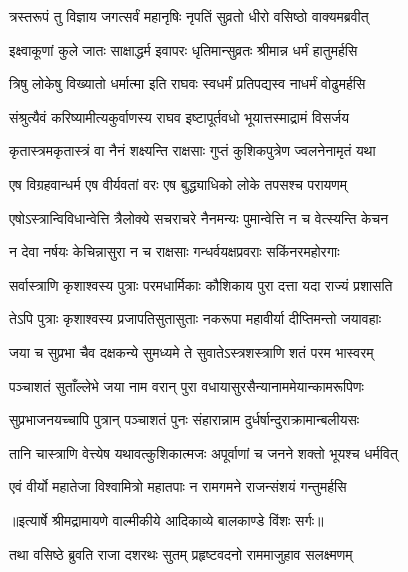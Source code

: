\twolineshloka
{त्रस्तरूपं तु विज्ञाय जगत्सर्वं महानृषिः}
{नृपतिं सुव्रतो धीरो वसिष्ठो वाक्यमब्रवीत्} %

\twolineshloka
{इक्ष्वाकूणां कुले जातः साक्षाद्धर्म इवापरः}
{धृतिमान्सुव्रतः श्रीमान्न धर्मं हातुमर्हसि} %

\twolineshloka
{त्रिषु लोकेषु विख्यातो धर्मात्मा इति राघवः}
{स्वधर्मं प्रतिपद्यस्व नाधर्मं वोढुमर्हसि} %

\twolineshloka
{संश्रुत्यैवं करिष्यामीत्यकुर्वाणस्य राघव}
{इष्टापूर्तवधो भूयात्तस्माद्रामं विसर्जय} %

\twolineshloka
{कृतास्त्रमकृतास्त्रं वा नैनं शक्ष्यन्ति राक्षसाः}
{गुप्तं कुशिकपुत्रेण ज्वलनेनामृतं यथा} %

\twolineshloka
{एष विग्रहवान्धर्म एष वीर्यवतां वरः}
{एष बुद्ध्याधिको लोके तपसश्च परायणम्} %

\twolineshloka
{एषोऽस्त्रान्विविधान्वेत्ति त्रैलोक्ये सचराचरे}
{नैनमन्यः पुमान्वेत्ति न च वेत्स्यन्ति केचन} %

\twolineshloka
{न देवा नर्षयः केचिन्नासुरा न च राक्षसाः}
{गन्धर्वयक्षप्रवराः सकिंनरमहोरगाः} %

\twolineshloka
{सर्वास्त्राणि कृशाश्वस्य पुत्राः परमधार्मिकाः}
{कौशिकाय पुरा दत्ता यदा राज्यं प्रशासति} %

\twolineshloka
{तेऽपि पुत्राः कृशाश्वस्य प्रजापतिसुतासुताः}
{नकरूपा महावीर्या दीप्तिमन्तो जयावहाः} %

\twolineshloka
{जया च सुप्रभा चैव दक्षकन्ये सुमध्यमे}
{ते सुवातेऽस्त्रशस्त्राणि शतं परम भास्वरम्} %

\twolineshloka
{पञ्चाशतं सुताँल्लेभे जया नाम वरान् पुरा}
{वधायासुरसैन्यानाममेयान्कामरूपिणः} %

\twolineshloka
{सुप्रभाजनयच्चापि पुत्रान् पञ्चाशतं पुनः}
{संहारान्नाम दुर्धर्षान्दुराक्रामान्बलीयसः} %

\twolineshloka
{तानि चास्त्राणि वेत्त्येष यथावत्कुशिकात्मजः}
{अपूर्वाणां च जनने शक्तो भूयश्च धर्मवित्} %

\twolineshloka
{एवं वीर्यो महातेजा विश्वामित्रो महातपाः}
{न रामगमने राजन्संशयं गन्तुमर्हसि} %


{॥इत्यार्षे श्रीमद्रामायणे वाल्मीकीये आदिकाव्ये बालकाण्डे विंशः सर्गः॥}


\twolineshloka
{तथा वसिष्ठे ब्रुवति राजा दशरथः सुतम्}
{प्रहृष्टवदनो राममाजुहाव सलक्ष्मणम्} %

